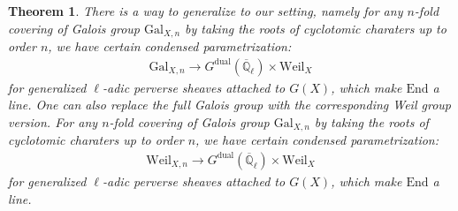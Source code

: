 \documentclass[12pt]{article}
\newtheorem{theorem}{Theorem}
\theoremstyle{definition}
\begin{document}
\begin{theorem}
There is a way to generalize \cite{FS} to our setting, namely for any $n$-fold covering of Galois group $\mathrm{Gal}_{X,n}$ by taking the roots of cyclotomic charaters up to order $n$, we have certain condensed parametrization:
\begin{align}
\mathrm{Gal}_{X,n} \rightarrow G^\mathrm{dual}(\overline{\mathbb{Q}}_\ell)\times \mathrm{Weil}_X
\end{align}
for generalized $\ell$-adic perverse sheaves attached to $G(X)$, which make $\mathrm{End}$ a line. One can also replace the full Galois group with the corresponding Weil group version. For any $n$-fold covering of Galois group $\mathrm{Gal}_{X,n}$ by taking the roots of cyclotomic charaters up to order $n$, we have certain condensed parametrization:
\begin{align}
\mathrm{Weil}_{X,n} \rightarrow G^\mathrm{dual}(\overline{\mathbb{Q}}_\ell)\times \mathrm{Weil}_X
\end{align}
for generalized $\ell$-adic perverse sheaves attached to $G(X)$, which make $\mathrm{End}$ a line. 
\end{theorem}
\end{document}
